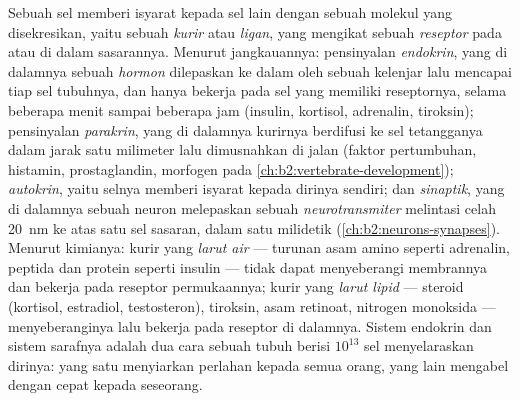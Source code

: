 \begin{definition}\label{def:b2:cell-signalling:kinds}
Sebuah sel memberi isyarat kepada sel lain dengan sebuah molekul yang
disekresikan, yaitu sebuah \emph{kurir} atau \emph{ligan}, yang
mengikat sebuah \emph{reseptor} pada atau di dalam sasarannya. Menurut
jangkauannya: pensinyalan \emph{endokrin}, yang di dalamnya sebuah
\emph{hormon} dilepaskan ke dalam  oleh sebuah kelenjar lalu
mencapai tiap sel tubuhnya, dan hanya bekerja pada sel yang memiliki
reseptornya, selama beberapa menit sampai beberapa jam (insulin,
kortisol, adrenalin, tiroksin); pensinyalan \emph{parakrin}, yang di
dalamnya kurirnya berdifusi ke sel tetangganya dalam jarak satu
milimeter lalu dimusnahkan di jalan (faktor pertumbuhan, histamin,
prostaglandin, morfogen pada \cref{ch:b2:vertebrate-development});
\emph{autokrin}, yaitu selnya memberi isyarat kepada dirinya sendiri;
dan \emph{sinaptik}, yang di dalamnya sebuah neuron melepaskan sebuah
\emph{neurotransmiter} melintasi celah \qty{20}{nm} ke atas satu sel
sasaran, dalam satu milidetik (\cref{ch:b2:neurons-synapses}). Menurut
kimianya: kurir yang \emph{larut air} --- turunan asam amino seperti
adrenalin, peptida dan protein seperti insulin --- tidak dapat
menyeberangi membrannya dan bekerja pada reseptor permukaannya; kurir
yang \emph{larut lipid} --- steroid (kortisol, estradiol, testosteron),
tiroksin, asam retinoat, nitrogen monoksida --- menyeberanginya lalu
bekerja pada reseptor di dalamnya. Sistem endokrin dan sistem sarafnya
adalah dua cara sebuah tubuh berisi $10^{13}$ sel menyelaraskan
dirinya: yang satu menyiarkan perlahan kepada semua orang, yang lain
mengabel dengan cepat kepada seseorang.
\end{definition}

